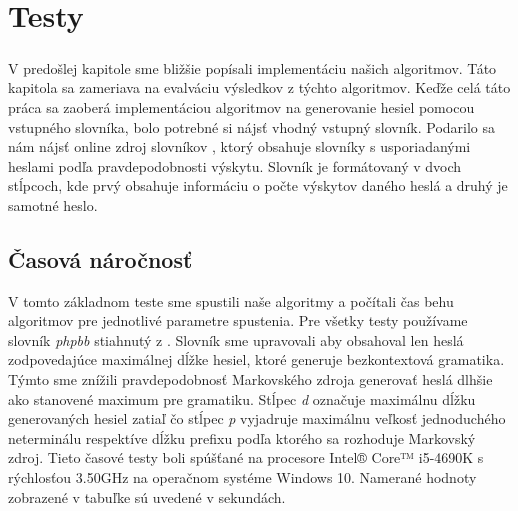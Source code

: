 \chapter{Testy}

\paragraph{}
V predošlej kapitole sme bližšie popísali implementáciu našich algoritmov. Táto kapitola sa zameriava na evalváciu výsledkov z týchto algoritmov. Keďže celá táto práca sa zaoberá implementáciou algoritmov na generovanie hesiel pomocou vstupného slovníka, bolo potrebné si nájsť vhodný vstupný slovník. Podarilo sa nám nájsť online zdroj slovníkov \cite{dictionaries}, ktorý obsahuje slovníky s usporiadanými heslami podľa pravdepodobnosti výskytu. Slovník je formátovaný v dvoch stĺpcoch, kde prvý obsahuje informáciu o počte výskytov daného heslá a druhý je samotné heslo.

\section{Časová náročnosť}
V tomto základnom teste sme spustili naše algoritmy a počítali čas behu algoritmov pre jednotlivé parametre spustenia. Pre všetky testy používame slovník \emph{phpbb} stiahnutý z \cite{dictionaries}. Slovník sme upravovali aby obsahoval len heslá zodpovedajúce maximálnej dĺžke hesiel, ktoré generuje bezkontextová gramatika. Týmto sme znížili pravdepodobnosť Markovského zdroja generovať heslá dlhšie ako stanovené maximum pre gramatiku. Stĺpec \emph{d} označuje maximálnu dĺžku generovaných hesiel zatiaľ čo stĺpec \emph{p} vyjadruje maximálnu veľkosť jednoduchého neterminálu respektíve dĺžku prefixu podľa ktorého sa rozhoduje Markovský zdroj. Tieto časové testy boli spúšťané na procesore Intel® Core™ i5-4690K s rýchlosťou 3.50GHz na operačnom systéme Windows 10. Namerané hodnoty zobrazené v tabuľke sú uvedené v sekundách.


